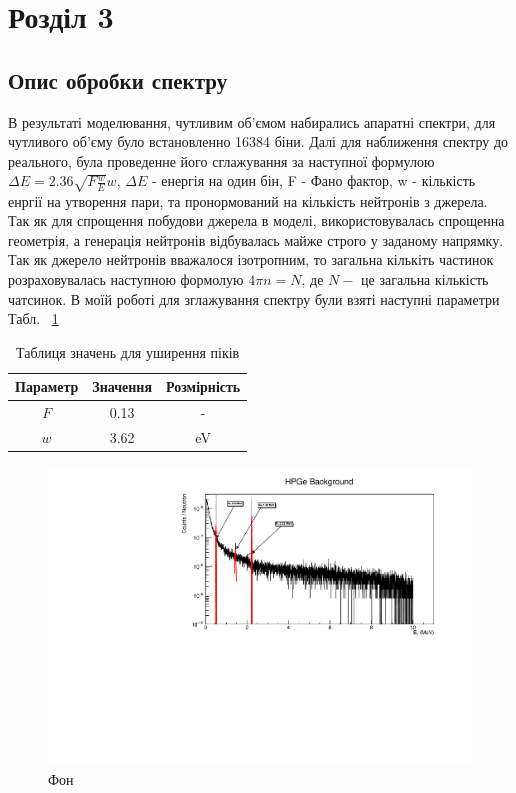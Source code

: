 \documentclass[a4paper, 14pt]{article}
\numberwithin{equation}{section}
\numberwithin{table}{section}
\begin{document}
\newpage 
\section{Розділ 3}
\setcounter{figure}{0}
\subsection{Опис обробки спектру}

В результаті моделювання, чутливим об'ємом набирались апаратні спектри, для чутливого об'єму було встановленно 16384 біни. Далі для наближення спектру до реального, була проведенне його сглажування за наступної формулою $\Delta{E} = 2.36 \sqrt{F  \frac{w}{E}}  w$, $\Delta{E}$ - енергія на один бін, F - Фано фактор, w - кількість енргії на утворення пари, та пронормований на кількість нейтронів з джерела. Так як для спрощення побудови джерела в моделі, використовувалась спрощенна геометрія, а генерація нейтронів відбувалась майже строго у заданому напрямку. Так як джерело нейтронів вважалося ізотропним, то загальна кількіть частинок розраховувалась наступною формолую $ 4 \pi n = N$, де $N -$ це загальна кількість чатсинок. В моїй роботі для зглажування спектру були взяті наступні параметри Табл. ~\ref{tabl:Param}
\begin{table}[h]
	\centering
	\begin{tabular}{|c|c|c|} 
		\hline
		Параметр & Значення &  Розмірність \\
		\hline
		$F$ & 0.13 & - \\
		\hline
		$w$ & 3.62 & eV \\		
		\hline
	\end{tabular}
	\caption{Таблиця значень для уширення піків} 
	\label{tabl:Param}
\end{table}
\begin{figure}[hbt!]
	\centering \includegraphics[width=1\textwidth]{res/background.pdf}
	\caption{Фон} 
	\label{ris:FonPicks}	
\end{figure} 
\end{document}
